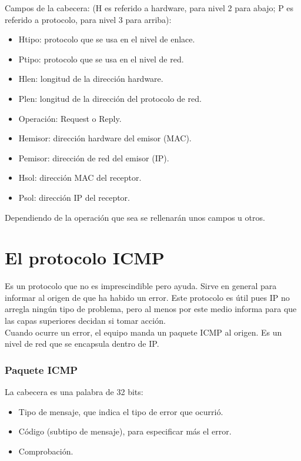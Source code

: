 \noindent Campos de la cabecera: (H es referido a hardware, para nivel 2 para abajo; P es referido a protocolo, para nivel 3 para arriba):
\begin{itemize}
    \item Htipo: protocolo que se usa en el nivel de enlace.
    \item Ptipo: protocolo que se usa en el nivel de red.
    \item Hlen: longitud de la dirección hardware.
    \item Plen: longitud de la dirección del protocolo de red.
    \item Operación: Request o Reply.
    \item Hemisor: dirección hardware del emisor (MAC).
    \item Pemisor: dirección de red del emisor (IP).
    \item Hsol: dirección MAC del receptor.
    \item Psol: dirección IP del receptor.
\end{itemize}

Dependiendo de la operación que sea se rellenarán unos campos u otros.

\section{El protocolo \acrshort{ICMP}}
Es un protocolo que no es imprescindible pero ayuda. Sirve en general para informar al origen de que ha habido un error. Este protocolo es útil pues \acrshort{IP} no arregla ningún tipo de problema, pero al menos por este medio informa para que las capas superiores decidan si tomar acción.\\

Cuando ocurre un error, el equipo manda un paquete ICMP al origen. Es un nivel de red que se encapsula dentro de \acrshort{IP}. 

\subsubsection{Paquete \acrshort{ICMP}}
La cabecera es una palabra de 32 bits:
\begin{itemize}
    \item Tipo de mensaje, que indica el tipo de error que ocurrió.
    \item Código (subtipo de mensaje), para especificar más el error.
    \item Comprobación.
\end{itemize}

